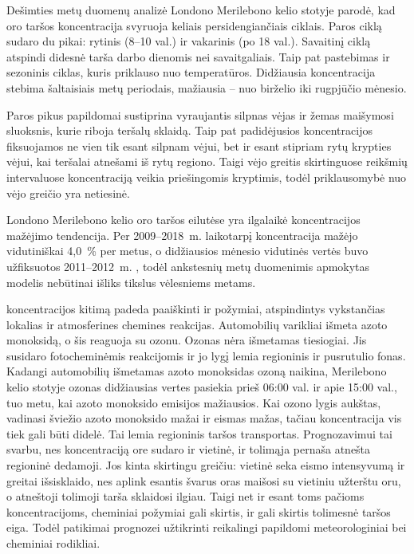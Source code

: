 \documentclass[]{VUMIFTemplateClass}
\begin{document}
    Dešimties metų duomenų analizė Londono Merilebono kelio stotyje \cite{KAMARA2021118479} parodė, kad oro taršos koncentracija svyruoja keliais persidengiančiais ciklais.
    Paros ciklą sudaro du pikai: rytinis (8–10 val.) ir vakarinis (po 18 val.).
    Savaitinį ciklą atspindi didesnė tarša darbo dienomis nei savaitgaliais.
    Taip pat pastebimas ir sezoninis ciklas, kuris priklauso nuo temperatūros.
    Didžiausia koncentracija stebima šaltaisiais metų periodais, mažiausia -- nuo birželio iki rugpjūčio mėnesio.

    Paros pikus papildomai sustiprina vyraujantis silpnas vėjas ir žemas maišymosi sluoksnis, kurie riboja teršalų sklaidą.
    Taip pat padidėjusios  koncentracijos fiksuojamos ne vien tik esant silpnam vėjui, bet ir esant stipriam rytų krypties vėjui, kai teršalai atnešami iš rytų regiono.
    Taigi vėjo greitis skirtinguose reikšmių intervaluose  koncentraciją veikia priešingomis kryptimis, todėl  priklausomybė nuo vėjo greičio yra netiesinė.

    Londono Merilebono kelio oro taršos eilutėse yra ilgalaikė koncentracijos mažėjimo tendencija.
    Per 2009--2018~m. laikotarpį  koncentracija mažėjo vidutiniškai 4,0~\% per metus, o didžiausios
    mėnesio vidutinės vertės buvo užfiksuotos 2011--2012~m.  \cite{KAMARA2021118479}, todėl
    ankstesnių metų duomenimis apmokytas modelis nebūtinai išliks tikslus vėlesniems metams.

     koncentracijos kitimą padeda paaiškinti ir požymiai, atspindintys vykstančias lokalias ir atmosferines chemines reakcijas.
    Automobilių varikliai išmeta azoto monoksidą, o šis reaguoja su ozonu.
    Ozonas nėra išmetamas tiesiogiai.
    Jis susidaro fotocheminėmis reakcijomis ir jo lygį lemia regioninis ir pusrutulio fonas.
    Kadangi automobilių išmetamas azoto monoksidas ozoną naikina, Merilebono kelio stotyje ozonas didžiausias vertes pasiekia prieš 06:00 val. ir apie 15:00 val., tuo metu, kai azoto monoksido emisijos mažiausios.
    Kai ozono lygis aukštas, vadinasi šviežio azoto monoksido mažai ir eismas mažas, tačiau  koncentracija vis tiek gali būti didelė.
    Tai lemia regioninis taršos transportas.
    Prognozavimui tai svarbu, nes  koncentraciją ore sudaro ir vietinė, ir tolimąja pernaša atnešta regioninė dedamoji.
    Jos kinta skirtingu greičiu: vietinė seka eismo intensyvumą ir greitai išsisklaido, nes aplink esantis švarus oras maišosi su vietiniu užterštu oru, o atneštoji tolimoji tarša sklaidosi ilgiau.
    Taigi net ir esant toms pačioms  koncentracijoms, cheminiai požymiai gali skirtis, ir gali skirtis tolimesnė taršos eiga.
    Todėl patikimai prognozei užtikrinti reikalingi papildomi meteorologiniai bei cheminiai rodikliai.
\end{document}

